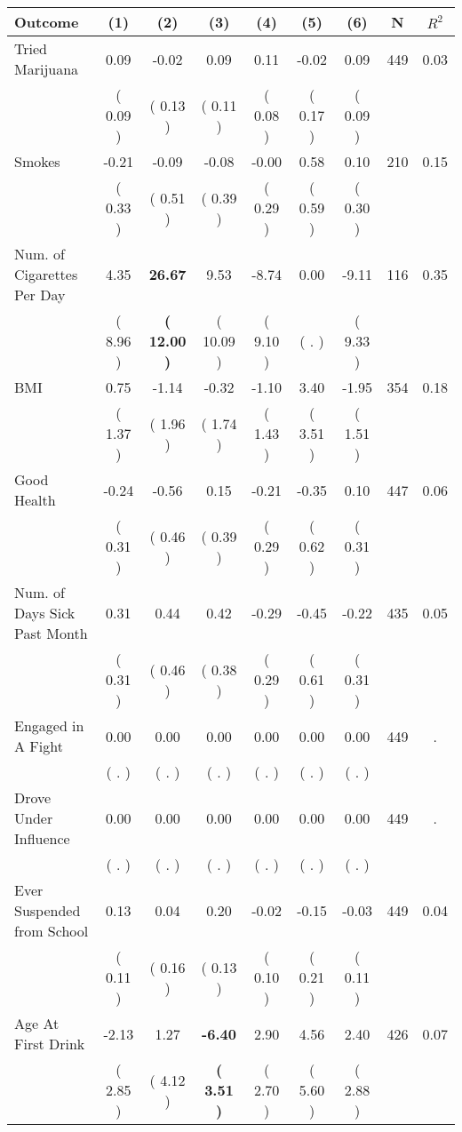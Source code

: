 \begin{tabular}{lcccccccc}
\toprule
 \textbf{Outcome} & \textbf{(1)} & \textbf{(2)} & \textbf{(3)} & \textbf{(4)} & \textbf{(5)} & \textbf{(6)} & \textbf{N} & \textbf{$ R^2$} \\
\midrule
Tried Marijuana &      0.09 &     -0.02 &      0.09 &      0.11 &     -0.02 &      0.09 & 449 &       0.03 \\ 
 & (     0.09 ) & (     0.13 ) & (     0.11 ) & (     0.08 ) & (     0.17 ) & (     0.09 ) & \\
Smokes &     -0.21 &     -0.09 &     -0.08 &     -0.00 &      0.58 &      0.10 & 210 &       0.15 \\ 
 & (     0.33 ) & (     0.51 ) & (     0.39 ) & (     0.29 ) & (     0.59 ) & (     0.30 ) & \\
Num. of Cigarettes Per Day &      4.35 & \textbf{    26.67} &      9.53 &     -8.74 &      0.00 &     -9.11 & 116 &       0.35 \\ 
 & (     8.96 ) & \textbf{(    12.00 )} & (    10.09 ) & (     9.10 ) & (        . ) & (     9.33 ) & \\
BMI &      0.75 &     -1.14 &     -0.32 &     -1.10 &      3.40 &     -1.95 & 354 &       0.18 \\ 
 & (     1.37 ) & (     1.96 ) & (     1.74 ) & (     1.43 ) & (     3.51 ) & (     1.51 ) & \\
Good Health &     -0.24 &     -0.56 &      0.15 &     -0.21 &     -0.35 &      0.10 & 447 &       0.06 \\ 
 & (     0.31 ) & (     0.46 ) & (     0.39 ) & (     0.29 ) & (     0.62 ) & (     0.31 ) & \\
Num. of Days Sick Past Month &      0.31 &      0.44 &      0.42 &     -0.29 &     -0.45 &     -0.22 & 435 &       0.05 \\ 
 & (     0.31 ) & (     0.46 ) & (     0.38 ) & (     0.29 ) & (     0.61 ) & (     0.31 ) & \\
Engaged in A Fight &      0.00 &      0.00 &      0.00 &      0.00 &      0.00 &      0.00 & 449 &          . \\ 
 & (        . ) & (        . ) & (        . ) & (        . ) & (        . ) & (        . ) & \\
Drove Under Influence &      0.00 &      0.00 &      0.00 &      0.00 &      0.00 &      0.00 & 449 &          . \\ 
 & (        . ) & (        . ) & (        . ) & (        . ) & (        . ) & (        . ) & \\
Ever Suspended from School &      0.13 &      0.04 &      0.20 &     -0.02 &     -0.15 &     -0.03 & 449 &       0.04 \\ 
 & (     0.11 ) & (     0.16 ) & (     0.13 ) & (     0.10 ) & (     0.21 ) & (     0.11 ) & \\
Age At First Drink &     -2.13 &      1.27 & \textbf{    -6.40} &      2.90 &      4.56 &      2.40 & 426 &       0.07 \\ 
 & (     2.85 ) & (     4.12 ) & \textbf{(     3.51 )} & (     2.70 ) & (     5.60 ) & (     2.88 ) & \\
\bottomrule
\end{tabular}
